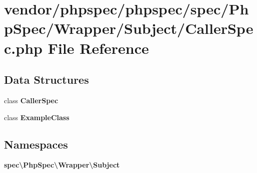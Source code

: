 \section{vendor/phpspec/phpspec/spec/\+Php\+Spec/\+Wrapper/\+Subject/\+Caller\+Spec.php File Reference}
\label{_caller_spec_8php}
\subsection*{Data Structures}
\begin{DoxyCompactItemize}
\item 
class {\bf Caller\+Spec}
\item 
class {\bf Example\+Class}
\end{DoxyCompactItemize}
\subsection*{Namespaces}
\begin{DoxyCompactItemize}
\item 
 {\bf spec\textbackslash{}\+Php\+Spec\textbackslash{}\+Wrapper\textbackslash{}\+Subject}
\end{DoxyCompactItemize}
